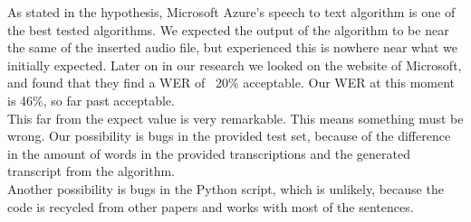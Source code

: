 \documentclass{article}
\begin{document}
As stated in the hypothesis, Microsoft Azure's speech to text algorithm is one of the best tested algorithms. We expected the output of the algorithm to be near the same of the inserted audio file, but experienced this is nowhere near what we initially expected. Later on in our research we looked on the website of Microsoft, and found that they find a WER of ~20\% acceptable. Our WER at this moment is 46\%, so far past acceptable.\\

This far from the expect value is very remarkable. This means something must be wrong. Our possibility is bugs in the provided test set, because of the difference in the amount of words in the provided transcriptions and the generated transcript from the algorithm. \\
Another possibility is bugs in the Python script, which is unlikely, because the code is recycled from other papers and works with most of the sentences.

 
 
\end{document}
